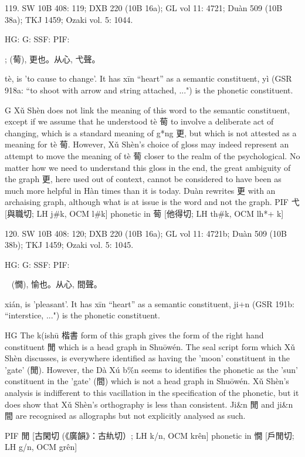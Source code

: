 119. SW 10B 408: 119; DXB 220 (10B 16a); GL vol 11: 4721; Duàn 509 (10B 38a); TKJ 1459; Ozaki vol. 5: 1044.


HG:
G: SSF: PIF:

; (䓒),
更也。从心, 弋聲。


tè,
is 'to cause to change'.
It has xīn ``heart'' as a semantic constituent,
yì (GSR 918a: ``to shoot with arrow and string attached, ...") is the phonetic constituent.

G   Xǔ Shèn does not link the meaning of this word to the semantic constituent, except if we assume that he understood tè 䓒 to involve a deliberate act of changing, which is a standard meaning of g*ng 更, but which is not attested as a meaning for tè 䓒. However, Xǔ Shèn's choice of gloss may indeed represent an attempt to move the meaning of tè 䓒 closer to the realm of the psychological. No matter how we need to understand this gloss in the end, the great ambiguity of the graph 更, here used out of context, cannot be considered to have been as much more helpful in Hàn times than it is today.
    Duàn rewrites 更 with an archaising graph, although what is at issue is the word and not the graph.
PIF   弋[與職切; LH j\#k, OCM l\#k] phonetic in 䓒 [他得切; LH th\#k, OCM lh*+ k]

120. SW 10B 408: 120; DXB 220 (10B 16a); GL vol 11: 4721b; Duàn 509 (10B 38b); TKJ 1459; Ozaki vol. 5: 1045.


HG:
G: SSF: PIF:

  (憪), 愉也。从心,
間聲。


xián,
is 'pleasant'.
It has xīn ``heart'' as a semantic constituent,
ji+n (GSR 191b: ``interstice, ...") is the phonetic constituent.

HG The k(ishū 楷書 form of this graph gives the form of the right hand constituent 閒 which is a head graph in Shuōwén. The seal script form which Xǔ Shèn discusses, is everywhere identified as having the 'moon' constituent in the 'gate' (閒). However, the Dà Xú b\%n seems to identifies the phonetic as the 'sun' constituent in the 'gate' (間) which is not a head graph in Shuōwén. Xǔ Shèn's analysis is indifferent to this vacillation in the specification of the phonetic, but it does show that Xǔ Shèn's orthography is less than consistent. Ji&n 閒 and ji&n 間 are recognised as allographs but not explicitly analysed as such.



PIF     閒 [古閑切 (《廣韻》：古䊵切）; LH k/n, OCM krên] phonetic in 憪 [戶閒切; LH g/n, OCM grên]


